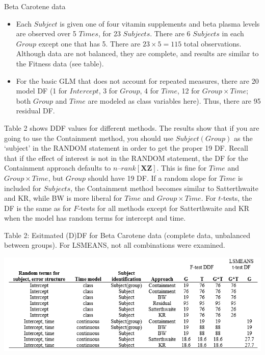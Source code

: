 \documentclass[
  9pt,
  ignorenonframetext,
]{beamer}
\begin{document}
\begin{frame}{Beta Carotene data}
\protect\hypertarget{beta-carotene-data}{}
\begin{itemize}
\item
  Each \(Subject\) is given one of four vitamin supplements and beta
  plasma levels are observed over 5 \(Times\), for 23 \(Subjects\).
  There are 6 \(Subjects\) in each \(Group\) except one that has 5.
  There are \(23 \times 5=115\) total observations. Although data are
  not balanced, they are complete, and results are similar to the
  Fitness data (see table).
\item
  For the basic GLM that does not account for repeated measures, there
  are 20 model DF (1 for \(Intercept\), 3 for \(Group\), 4 for \(Time\),
  12 for \(Group \times Time\); both \(Group\) and \(Time\) are modeled
  as class variables here). Thus, there are 95 residual DF.
\end{itemize}
\end{frame}

\begin{frame}{}
\protect\hypertarget{section-3}{}
Table 2 shows DDF values for different methods. The results show that if
you are going to use the Containment method, you should use
\(Subject(Group)\) as the `subject' in the RANDOM statement in order to
get the proper 19 DF. Recall that if the effect of interest is not in
the RANDOM statement, the DF for the Containment approach defaults to
\(n–rank[\pmb {XZ}]\). This is fine for \(Time\) and
\(Group \times Time\), but \(Group\) should have 19 DF. If a random
slope for \(Time\) is included for \(Subjects\), the Containment method
becomes similar to Satterthwaite and KR, while BW is more liberal for
\(Time\) and \(Group \times Time\). For \(t\)-tests, the DF is the same
as for \(F\)-tests for all methods except for Satterthwaite and KR when
the model has random terms for intercept and time.

\begin{block}{Table 2: Esitmated (D)DF for Beta Carotene data (complete
data, unbalanced between groups). For LSMEANS, not all combinations were
examined.}
\protect\hypertarget{table-2-esitmated-ddf-for-beta-carotene-data-complete-data-unbalanced-between-groups.-for-lsmeans-not-all-combinations-were-examined.}{}
\begin{center}\includegraphics[width=0.8\linewidth]{figs_L6/t2} \end{center}
\end{block}
\end{frame}
\end{document}
